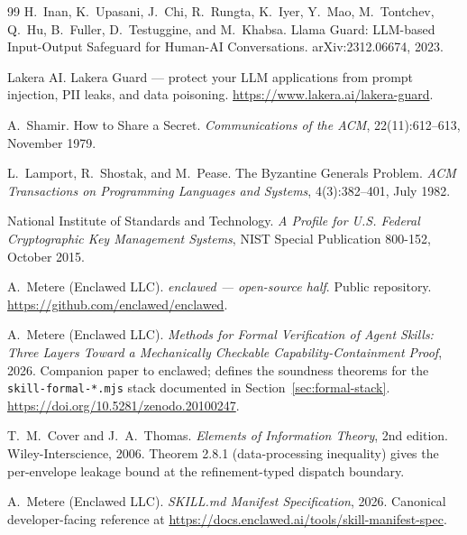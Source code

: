 \documentclass[11pt]{article}
\begin{document}
\begin{thebibliography}{99}
H.~Inan, K.~Upasani, J.~Chi, R.~Rungta, K.~Iyer, Y.~Mao, M.~Tontchev,
Q.~Hu, B.~Fuller, D.~Testuggine, and M.~Khabsa.
Llama Guard: LLM-based Input-Output Safeguard for Human-AI
Conversations.
arXiv:2312.06674, 2023.

Lakera AI.
Lakera Guard --- protect your LLM applications from prompt injection,
PII leaks, and data poisoning.
\url{https://www.lakera.ai/lakera-guard}.

A.~Shamir.
How to Share a Secret.
\emph{Communications of the ACM}, 22(11):612--613, November 1979.

L.~Lamport, R.~Shostak, and M.~Pease.
The Byzantine Generals Problem.
\emph{ACM Transactions on Programming Languages and Systems},
4(3):382--401, July 1982.

National Institute of Standards and Technology.
\emph{A Profile for U.S. Federal Cryptographic Key Management Systems},
NIST Special Publication 800-152, October 2015.

A.~Metere (Enclawed LLC).
\emph{enclawed --- open-source half}. Public repository.
\url{https://github.com/enclawed/enclawed}.

A.~Metere (Enclawed LLC).
\emph{Methods for Formal Verification of Agent Skills: Three Layers
Toward a Mechanically Checkable Capability-Containment Proof}, 2026.
Companion paper to enclawed; defines the soundness theorems for the
\texttt{skill-formal-*.mjs} stack documented in
Section~\ref{sec:formal-stack}.
\url{https://doi.org/10.5281/zenodo.20100247}.

T.~M.~Cover and J.~A.~Thomas.
\emph{Elements of Information Theory}, 2nd edition.
Wiley-Interscience, 2006. Theorem 2.8.1 (data-processing inequality)
gives the per-envelope leakage bound at the refinement-typed dispatch
boundary.

A.~Metere (Enclawed LLC).
\emph{SKILL.md Manifest Specification}, 2026. Canonical
developer-facing reference at
\url{https://docs.enclawed.ai/tools/skill-manifest-spec}.

\end{thebibliography}
\end{document}
